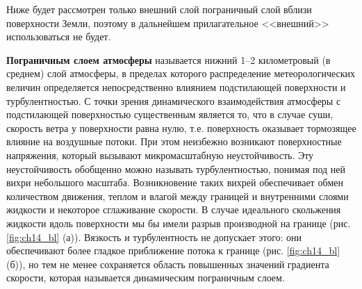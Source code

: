 Ниже будет рассмотрен только внешний слой пограничный слой вблизи поверхности Земли, поэтому в дальнейшем прилагательное <<внешний>> использоваться не будет. 

\textbf{Пограничным слоем атмосферы} называется нижний 1--2 километровый (в среднем) слой атмосферы, в пределах которого распределение метеорологических величин определяется непосредственно влиянием подстилающей поверхности и турбулентностью. С точки зрения динамического взаимодействия атмосферы с подстилающей поверхностью существенным является то, что в случае суши, скорость ветра у поверхности равна нулю, т.е. поверхность оказывает тормозящее влияние на воздушные потоки. При этом неизбежно возникают поверхностные напряжения, который вызывают микромасштабную неустойчивость. Эту неустойчивость обобщенно можно называть турбулентностью, понимая под ней вихри небольшого масштаба. Возникновение таких вихрей обеспечивает обмен количеством движения, теплом и влагой между границей и внутренними слоями жидкости и некоторое сглаживание скорости. В случае идеального скольжения жидкости вдоль поверхности мы бы имели разрыв производной на границе (рис. \ref{fig:ch14_bl} (а)). Вязкость и турбулентность не допускает этого: они обеспечивают более гладкое приближение потока к границе (рис. \ref{fig:ch14_bl} (б)), но тем не менее сохраняется область повышенных значений градиента скорости, которая называется динамическим пограничным слоем. 
